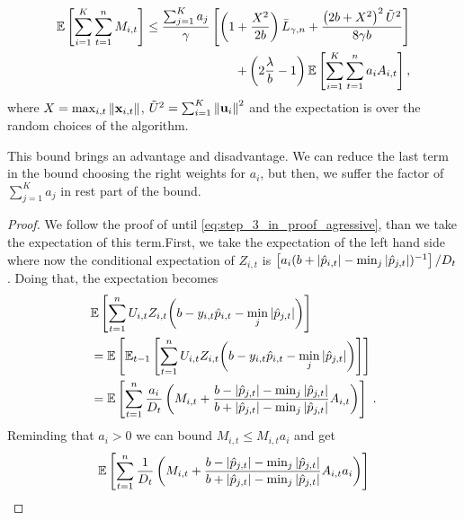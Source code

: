 {\begin{theorem}
\begin{displaymath}
\begin{split}
\mathbb{E}\left[ \sum_{i=1}^{K}\sum_{t=1}^{n}{M_{i,t}} \right]
\le\frac{\sum_{j=1}^Ka_{j}}{\gamma}\left[{\left(1+\frac{X^2}{2b} \right){\bar L}_{\gamma,n}+
\frac{\left({2b+X^2}\right)^2\tilde{U}^2}{8{\gamma}b}}\right]\\ 
+
\left({2\frac{\lambda}{b}-1}\right)\mathbb{E}\left[{\sum_{i=1}^{K}\sum_{t=1}^{n}{a_{i}A_{i,t}}}\right],
\label{bound_FO_SHAMPO_prior}
\end{split}
\end{displaymath}
 where $X=\max_{i,t}\Vert\mathbf{x}_{i,t}\Vert$,
$\tilde{U}^2=\sum_{i=1}^{K}\left\Vert {\mathbf{u}_{i}} \right\Vert^2$ and the expectation is over the
random choices of the algorithm.
\end{theorem} \label{thm:FO_bound_aggressive}
This bound brings an advantage and disadvantage. We can reduce the last term in the bound choosing the right weights for $a_i$, but then, we suffer the factor of $\sum_{j=1}^Ka_{j}$ in rest part of the bound. 
\\
\begin{proof}
We follow the proof of  until \eqref{eq:step_3_in_proof_agressive}, than we take the expectation of this term.First, we take the expectation of the left hand side where now the conditional expectation of $Z_{i,t}$ is $\left[{a_{i}(b+|\hat{p}_{i,t}|-\min_j| \hat{p}_{j,t}|)^{-1}}\right]/D_{t}$. Doing that, the expectation becomes 
\begin{align*}
\begin{split}
&\mathbb{E}\left[{\sum_{t=1}^{n}U_{i,t}Z_{i,t}{\left({b-y_{i,t}\hat{p}_{i,t}-\min_{j}{\left\vert{ \hat{p}_{j,t}}\right\vert}}\right)}}\right] \\
        &=\mathbb{E}\left[{\mathbb{E}_{t-1}\left[{{\sum_{t=1}^{n}{U_{i,t}Z_{i,t}{\left(b-y_{i,t}\hat{p}_{i,t}-\min_{j}{\left\vert{\hat{p}_{j,t}}\right\vert}\right)}}}}\right]}\right] \\
&=\mathbb{E}\left[{\sum_{t=1}^{n}{\frac{a_{i}}{D_{t}}\left({M_{i,t}+\frac{b-\left\vert{\hat{p}_{j,t}}\right\vert-\min_{j}{\left\vert{\hat{p}_{j,t}}\right\vert }}{b+\left\vert{\hat{p}_{j,t}}\right\vert-\min_{j}{\left\vert{\hat{p}_{j,t}}\right\vert}}A_{i,t} }\right)}}\right]~.
\end{split}
\end{align*}
Reminding that $a_{i} >0$ we can bound $M_{i,t} \le M_{i,t}a_{i}$ and get 
\begin{equation}
\begin{split}
\mathbb{E}\left[ \sum_{t=1}^{n}{\frac{1}{D_{t}}}\paren{M_{i,t}+\frac{b-\abs{\hat{p}_{j,t}}-\min_{j}{\abs{\hat{p}_{j,t}} }}{b+\abs{\hat{p}_{j,t}}-\min_{j}{\abs{\hat{p}_{j,t}}}}A_{i,t}a_{i} } \right]

\end{split}
\end{equation}
\end{proof}}
